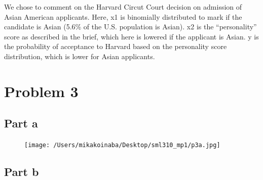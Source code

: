 \documentclass{article}\usepackage[]{graphicx}\usepackage[]{color}
\begin{document}
\noindent We chose to comment on the Harvard Circut Court decision on admission of Asian American applicants.  Here, x1 is binomially distributed to mark if the candidate is Asian (5.6\% of the U.S. population is Asian).  x2 is the ``personality'' score as described in the brief, which here is lowered if the applicant is Asian. y is the probability of acceptance to Harvard based on the personality score distribution, which is lower for Asian applicants. \pagebreak

\section*{Problem 3}
\subsection*{Part a}
\begin{figure}[h!]
\texttt{[image: /Users/mikakoinaba/Desktop/sml310\_mp1/p3a.jpg]}
\end{figure}

\subsection*{Part b}




\end{document}
